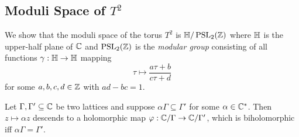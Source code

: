 \documentclass[../Moduli_Spaces_of_Riemann_Surfaces.tex]{subfiles}
\begin{document}
    \subsection{Moduli Space of $T^2$}
    We show that the moduli space of the torus $T^2$ is $\mathbb{H}/\operatorname{PSL}_{2}\!\left(\mathbb{Z}\right)$ where $\mathbb{H}$ is the upper-half plane of $\mathbb{C}$ and $\operatorname{PSL}_{2}\!\left(\mathbb{Z}\right)$ is the \textit{modular group} consisting of all functions $\gamma:\mathbb{H}\to\mathbb{H}$ mapping
    \begin{equation*}
        \tau\mapsto\frac{a\tau+b}{c\tau+d}
    \end{equation*}
    for some $a,b,c,d\in\mathbb{Z}$ with $ad-bc=1$.
    \begin{lemma}\label{4.1:lem:moduli_space_torus_1}
        Let $\Gamma,\Gamma'\subseteq\mathbb{C}$ be two lattices and suppose $\alpha\Gamma\subseteq\Gamma'$ for some $\alpha\in\mathbb{C}^\ast$. Then $z\mapsto\alpha z$ descends to a holomorphic map $\varphi:\mathbb{C}/\Gamma\to\mathbb{C}/\Gamma'$, which is biholomorphic iff $\alpha\Gamma=\Gamma'$.
    \end{lemma}\vspace{-0.08in}
\end{document}
